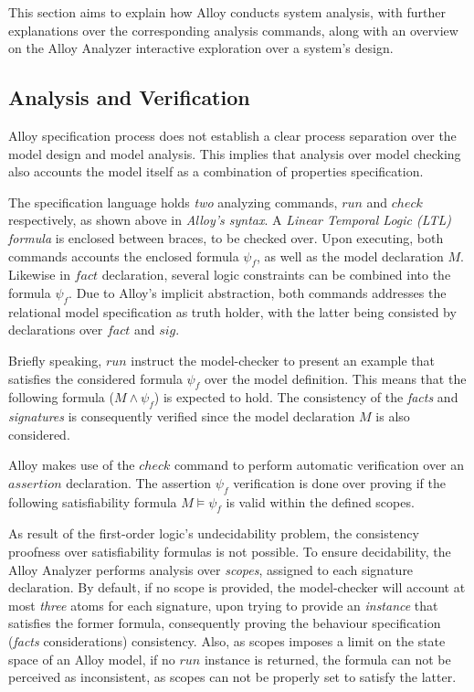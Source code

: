 This section aims to explain how Alloy conducts system analysis, with further explanations over the corresponding analysis commands, along with an overview on the Alloy Analyzer interactive exploration over a system's design. 

\subsection{Analysis and Verification}

Alloy specification process does not establish a clear process separation over the model design and model analysis. This implies that analysis over model checking also accounts the model itself as a combination of properties specification. 

The specification language holds \textit{two} analyzing commands, $run$ and $check$ respectively, as shown above in \textit{Alloy's syntax}. A \textit{Linear Temporal Logic (LTL) formula} is enclosed between braces, to be checked over. Upon executing, both commands accounts the enclosed formula $\psi_{f}$, as well as the model declaration ${M}$. Likewise in $fact$ declaration, several logic constraints can be combined into the formula $\psi_{f}$. Due to Alloy's implicit abstraction, both commands addresses the relational model specification as truth holder, with the latter being consisted by declarations over $fact$ and $sig$. 

Briefly speaking, $run$ instruct the model-checker to present an example that satisfies the considered formula $\psi_{f}$ over the model definition. This means that the following formula ($M \wedge \psi_{f}$) is expected to hold. The consistency of the \textit{facts} and \textit{signatures} is consequently verified since the model declaration $M$ is also considered. 

Alloy makes use of the $check$ command to perform automatic verification over an $assertion$ declaration. The assertion $\psi_{f}$ verification is done over proving if the following satisfiability formula $M \models \psi_{f}$ is valid within the defined scopes. %

As result of the first-order logic's undecidability problem, the consistency proofness over satisfiability formulas is not possible. \cite{vakili2012temporal} To ensure decidability, the Alloy Analyzer performs analysis over \textit{scopes}, assigned to each signature declaration. By default, if no scope is provided, the model-checker will account at most \textit{three} atoms for each signature, upon trying to provide an \textit{instance} that satisfies the former formula, consequently proving the behaviour specification (\textit{facts} considerations) consistency. Also, as scopes imposes a limit on the state space of an Alloy model, if no $run$ instance is returned, the formula can not be perceived as inconsistent, as scopes can not be properly set to satisfy the latter.

